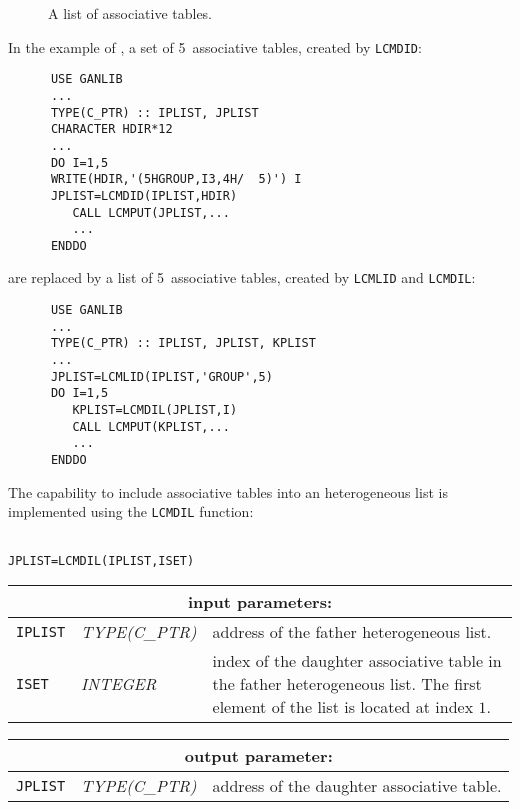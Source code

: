 \begin{figure}[htbp]
\begin{center} 
\epsfxsize=9cm
\centerline{ }
\parbox{12cm}{\caption{A list of associative tables.}\label{fig:f2}}   
\end{center}  
\end{figure}
\goodbreak

In the example of , a set of 5~associative tables, created by {\tt LCMDID}:

\begin{verbatim}
      USE GANLIB
      ...
      TYPE(C_PTR) :: IPLIST, JPLIST
      CHARACTER HDIR*12
      ...
      DO I=1,5
      WRITE(HDIR,'(5HGROUP,I3,4H/  5)') I
      JPLIST=LCMDID(IPLIST,HDIR)
         CALL LCMPUT(JPLIST,...
         ...
      ENDDO
\end{verbatim}

\noindent are replaced by a list of 5~associative tables, created by {\tt LCMLID} and {\tt LCMDIL}:

\begin{verbatim}
      USE GANLIB
      ...
      TYPE(C_PTR) :: IPLIST, JPLIST, KPLIST
      ...
      JPLIST=LCMLID(IPLIST,'GROUP',5)
      DO I=1,5
         KPLIST=LCMDIL(JPLIST,I)
         CALL LCMPUT(KPLIST,...
         ...
      ENDDO
\end{verbatim}

\vskip 0.2cm

The capability to include associative tables into an heterogeneous list is implemented using
the {\tt LCMDIL} function:

\begin{verbatim}

JPLIST=LCMDIL(IPLIST,ISET)
\end{verbatim}

\noindent
\begin{tabular}{|p{1.5cm}|p{3cm}|p{10cm}|}
\hline
\multicolumn{3}{|c|}{\bf input parameters:} \\
\hline
{\tt IPLIST} & {\it TYPE(C\_PTR)} & address of the father heterogeneous list. \\
\hline
{\tt ISET} & {\it INTEGER} & index of the daughter associative table in the father heterogeneous list.
The first element of the list is located at index $1$. \\
\hline
\end{tabular}

\vskip 0.8cm

\noindent
\begin{tabular}{|p{1.5cm}|p{3cm}|p{10cm}|}
\hline
\multicolumn{3}{|c|}{\bf output parameter:} \\
\hline
{\tt JPLIST} & {\it TYPE(C\_PTR)} & address of the daughter associative table. \\
\hline
\end{tabular}

